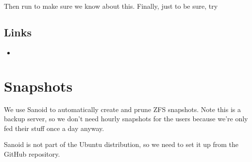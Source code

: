 \documentclass[a4paper,10pt,english]{sphinxmanual}
\begin{document}
Then run  to make sure we know about this. Finally, just to be sure, try

\begin{sphinxVerbatim}[commandchars=\\\{\}]
   
\end{sphinxVerbatim}


\section{Links}
\label{\detokenize{nfs:links}}\begin{itemize}
\item {} 

\end{itemize}


\chapter{Snapshots}
\label{\detokenize{snapshots:snapshots}}\label{\detokenize{snapshots::doc}}
We use Sanoid  to automatically create and
prune ZFS snapshots. Note this is a backup server, so we don’t need hourly
snapshots for the users because we’re only fed their stuff once a day anyway.

Sanoid is not part of the Ubuntu distribution, so we need to set it up from the
GitHub repository.

\begin{sphinxVerbatim}[commandchars=\\\{\}]
   
 
   
   
  
   
   
\end{sphinxVerbatim}
\end{document}
